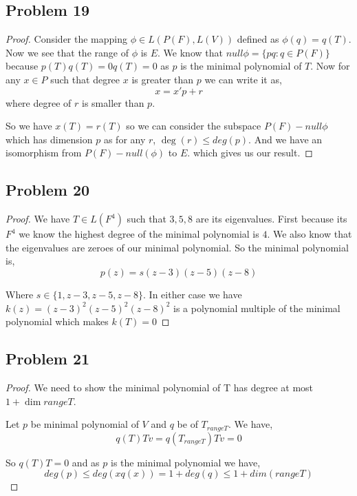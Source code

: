 \documentclass[a4paper]{report}
\begin{document}
\subsection*{Problem 19}
\begin{proof}
   Consider the mapping $\phi \in L(P(F), L(V))$ defined as $\phi(q) = q(T)$. Now we see that the range of $\phi$ is $E$.  We know that $null \phi = \{pq: q \in P(F)\}$ because  $p(T)q(T) = 0 q(T) = 0$ as $p$ is the minimal polynomial of $T$. Now for any $x \in P$ such that degree $x$ is greater than $p$ we can write it as, 
   $$ x = x' p + r $$  where degree of $r$ is smaller than $p$.

   So we have $x(T) = r(T)$ so we can consider the subspace  $P(F) - null \phi$ which has dimension $p$ as for any $r$, $\deg(r) \le deg (p)$. And we have an isomorphism from $P(F) - null(\phi)$ to $E$. which gives us our result.

\end{proof}

\subsection*{Problem 20}
\begin{proof}
   We have $T \in L(F^{4})$ such that $3,5,8$ are its eigenvalues. First because its $F^{4}$ we know the highest degree of the minimal polynomial is $4$. We also know that the eigenvalues are zeroes of our minimal polynomial. So the minimal polynomial is, 
   $$p(z) =  s(z - 3)(z - 5)(z - 8)$$

   Where $s \in \{1, z - 3, z- 5, z- 8\}$. In either case we have $k(z) =(z - 3)^2(z - 5)^2 (z - 8)^2$ is a polynomial multiple of the minimal polynomial which makes $k(T) = 0$
\end{proof}

\subsection*{Problem 21}
\begin{proof}
   We need to show the minimal polynomial of T has degree at most $1 + \dim range T$. 

   Let  $p$ be minimal polynomial of $V$ and $q$ be of $T_{range T}$. We have,  
      $$ q(T) Tv = q(T_{rangeT})Tv = 0 $$

      So $q(T)T = 0$ and as $p$ is the minimal polynomial we have, 
      $$ deg(p) \le deg(xq(x)) = 1 + deg(q) \le 1 + dim(rangeT) $$ 
\end{proof}
\end{document}
